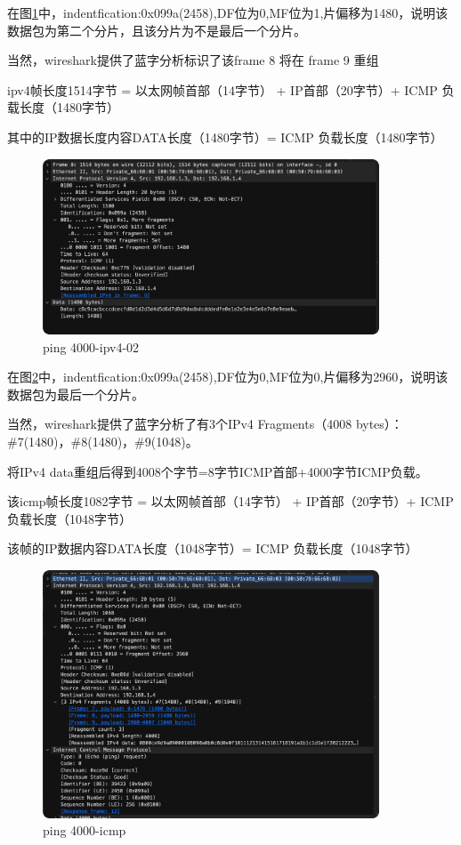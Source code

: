 \documentclass[a4paper,12pt]{report}
\begin{document}
\begin{spacing}{1.5}
在图\ref{pic:4000-ipv4-02}中，indentfication:0x099a(2458),DF位为0,MF位为1,片偏移为1480，说明该数据包为第二个分片，且该分片为不是最后一个分片。

当然，wireshark提供了蓝字分析标识了该frame 8 将在 frame 9 重组

ipv4帧长度1514字节 = 以太网帧首部（14字节） + IP首部（20字节）+ ICMP 负载长度（1480字节）

其中的IP数据长度内容DATA长度（1480字节）= ICMP 负载长度（1480字节）



\begin{figure}[htb!]
  \centering
\includegraphics[width=10cm]{figure/4000_ipv4_02.png}
\caption{ping 4000-ipv4-02}
\label{pic:4000-ipv4-02}
\end{figure}

在图\ref{pic:4000-icmp}中，indentfication:0x099a(2458),DF位为0,MF位为0,片偏移为2960，说明该数据包为最后一个分片。

当然，wireshark提供了蓝字分析了有3个IPv4 Fragments（4008 bytes）：\#7(1480)，\#8(1480)，\#9(1048)。

将IPv4 data重组后得到4008个字节=8字节ICMP首部+4000字节ICMP负载。

该icmp帧长度1082字节 = 以太网帧首部（14字节） + IP首部（20字节）+ ICMP 负载长度（1048字节）

该帧的IP数据内容DATA长度（1048字节）= ICMP 负载长度（1048字节）
\begin{figure}[htb!]
  \centering
\includegraphics[width=10cm]{figure/4000_icmp.png}
\caption{ping 4000-icmp}
\label{pic:4000-icmp}
\end{figure}





\end{spacing}
\end{document}
